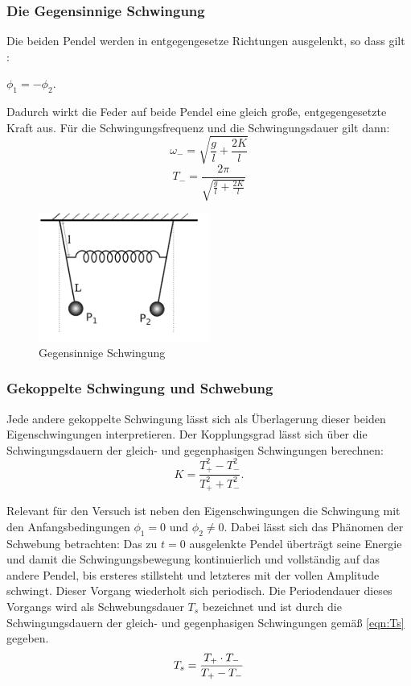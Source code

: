 \subsubsection{Die Gegensinnige Schwingung}

Die beiden Pendel werden in entgegengesetze Richtungen ausgelenkt, so dass
gilt :

$\phi_1 = -\phi_2$.

Dadurch wirkt die Feder auf beide Pendel eine gleich große,
entgegengesetzte Kraft aus. Für die Schwingungsfrequenz und die Schwingungsdauer
gilt dann:
\begin{equation}
\label{eqn:omega-}
\omega_-=\sqrt{\frac{g}{l}+\frac{2K}{l}}
\end{equation}
\begin{equation}
\label{eqn:T-}
T_-=\frac{2\pi}{\sqrt{\frac{g}{l}+\frac{2K}{l}}}
\end{equation}
\begin{figure}[H]
  \centering
  \includegraphics[width=0.5\textwidth]{graphics/gegensinnig.png}
  \caption{Gegensinnige Schwingung \cite{Wikipedia}}
\end{figure}

\subsubsection{Gekoppelte Schwingung und Schwebung}

Jede andere gekoppelte Schwingung lässt sich als Überlagerung dieser beiden
Eigenschwingungen interpretieren. Der Kopplungsgrad lässt sich über die
Schwingungsdauern der gleich- und gegenphasigen Schwingungen berechnen:
\begin{equation}
  \label{eqn:k}
  K = \frac{T_+^2-T_-^2}{T_+^2+T_-^2}.
\end{equation}

Relevant für den Versuch ist neben den
Eigenschwingungen die Schwingung mit den Anfangsbedingungen
$\phi_1 = 0$ und $\phi_2 \neq 0$.
Dabei lässt sich das Phänomen der Schwebung betrachten: Das zu $t = 0$
ausgelenkte Pendel überträgt seine Energie und damit die Schwingungsbewegung
kontinuierlich und vollständig
auf das andere Pendel, bis ersteres stillsteht und letzteres
mit der vollen Amplitude schwingt. Dieser Vorgang wiederholt sich periodisch.
Die Periodendauer dieses Vorgangs wird als Schwebungsdauer $T_s$ bezeichnet und
ist durch die Schwingungsdauern der gleich- und gegenphasigen Schwingungen
gemäß \ref{eqn:Ts} gegeben.
\begin{equation}
  \centering
  T_s  = \frac{T_+ \cdot T_-}{T_+ - T_-}
  \label{eqn:Ts}
\end{equation}

